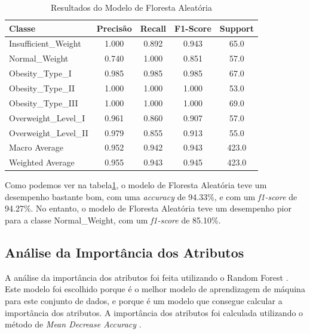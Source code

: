 \documentclass{easychair}
\begin{document}
\begin{table}[hbt!]
  \centering
  \begin{tabular}{l c c c c}
  \toprule
  Classe                & Precisão  & Recall & F1-Score & Support \\
  \midrule
  Insufficient\_Weight  & 1.000     & 0.892  & 0.943    & 65.0    \\
  Normal\_Weight        & 0.740     & 1.000  & 0.851    & 57.0    \\
  Obesity\_Type\_I      & 0.985     & 0.985  & 0.985    & 67.0    \\
  Obesity\_Type\_II     & 1.000     & 1.000  & 1.000    & 53.0    \\
  Obesity\_Type\_III    & 1.000     & 1.000  & 1.000    & 69.0    \\
  Overweight\_Level\_I  & 0.961     & 0.860  & 0.907    & 57.0    \\
  Overweight\_Level\_II & 0.979     & 0.855  & 0.913    & 55.0    \\
  \midrule
  Macro Average         & 0.952     & 0.942  & 0.943    & 423.0   \\
  Weighted Average      & 0.955     & 0.943  & 0.945    & 423.0   \\
  \bottomrule
  \end{tabular}
  \caption{Resultados do Modelo de Floresta Aleatória}
  \label{tab:random-forest-results}
\end{table}

Como podemos ver na tabela\ref{tab:random-forest-results}, o modelo de Floresta Aleatória teve um desempenho bastante bom, com uma \textit{accuracy} de 94.33\%, e com um \textit{f1-score} de 94.27\%. No entanto, o modelo de Floresta Aleatória teve um desempenho pior para a classe Normal\_Weight, com um \textit{f1-score} de 85.10\%.

\subsection{Análise da Importância dos Atributos}

A análise da importância dos atributos foi feita utilizando o Random Forest \cite{random-forest}. Este modelo foi escolhido porque é o melhor modelo de aprendizagem de máquina para este conjunto de dados, e porque é um modelo que consegue calcular a importância dos atributos. A importância dos atributos foi calculada utilizando o método de \textit{Mean Decrease Accuracy} \cite{mean-decrease-accuracy}.
\end{document}
